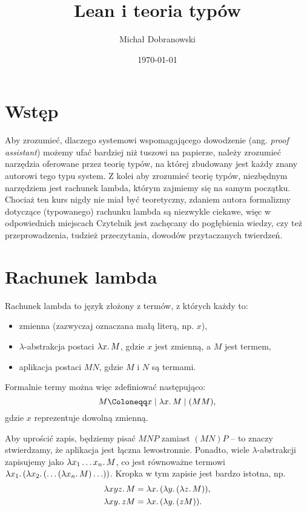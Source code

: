 \documentclass[polish,pretty]{angav}
\title{Lean i teoria typów}
\author{Michał Dobranowski}
\date{\today}
\begin{document}
\maketitle
\tableofcontents

\section{Wstęp}

Aby zrozumieć, dlaczego systemowi wspomagającego dowodzenie (ang. \textit{proof assistant}) możemy ufać bardziej niż tuszowi na papierze, należy zrozumieć narzędzia oferowane przez teorię typów, na której zbudowany jest każdy znany autorowi tego typu system.
Z kolei aby zrozumieć teorię typów, niezbędnym narzędziem jest rachunek lambda, którym zajmiemy się na samym początku.
Chociaż ten kurs nigdy nie miał być teoretyczny, zdaniem autora formalizmy dotyczące (typowanego) rachunku lambda są niezwykle ciekawe, więc w odpowiednich miejscach Czytelnik jest zachęcany do pogłębienia wiedzy, czy też przeprowadzenia, tudzież przeczytania, dowodów przytaczanych twierdzeń.

\section{Rachunek lambda}

Rachunek lambda to język złożony z termów, z których każdy to:
\begin{itemize}
    \item zmienna (zazwyczaj oznaczana małą literą, np. $x$),
    \item $\lambda$-abstrakcja postaci $\lambda x\ldotp M$, gdzie $x$ jest zmienną, a $M$ jest termem,
    \item aplikacja postaci $MN$, gdzie $M$ i $N$ są termami.
\end{itemize}

Formalnie termy można więc zdefiniować następująco:
\[ M \Coloneqq x \mid \lambda x\ldotp M \mid (MM), \]
gdzie $x$ reprezentuje dowolną zmienną.

Aby uprościć zapis, będziemy pisać $MNP$ zamiast $(MN)P$ -- to znaczy stwierdzamy, że aplikacja jest łączna lewostronnie. Ponadto, wiele $\lambda$-abstrakcji zapisujemy jako $\lambda x_1 \ldots x_n\ldotp M$, co jest równoważne termowi $\lambda x_1\ldotp (\lambda x_2\ldotp (\ldots (\lambda x_n\ldotp M) \ldots))$. Kropka w tym zapisie jest bardzo istotna, np.
\begin{align*}
    \lambda xyz\ldotp M &= \lambda x\ldotp (\lambda y\ldotp (\lambda z\ldotp M)), \\
    \lambda xy\ldotp z M &= \lambda x\ldotp (\lambda y\ldotp (z M)).
\end{align*}
\end{document}
